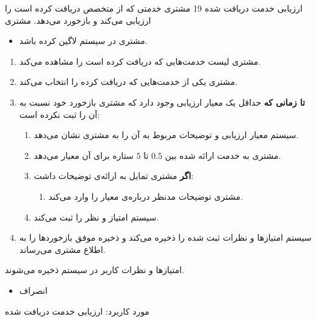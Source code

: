 {
\usecase
{
	ارزیابی خدمت دریافت شده
}
{19}
{
	مشتری خدمتی که از متخصص دریافت کرده است را ارزیابی می‌کند و بازخورد می‌دهد.
}
{
	مشتری
}
{}
{
		\begin{itemize}
		\vspace*{-0.6cm}
		\item 
		مشتری در سیستم لاگین کرده باشد.
	\end{itemize}
}
{
	\vspace*{-0.6cm}
	\begin{enumerate}
		\item 
		مشتری لیست خدمت‌‌هایی که دریافت کرده است را مشاهده می‌کند.
		\item
		مشتری یکی از خدمت‌هایی که دریافت کرده را انتخاب می‌کند.
		\item
		\textbf{تا زمانی که} حداقل یک معیار ارزیابی وجود دارد که مشتری بازخورد خود نسبت به آن را ثبت نکرده است:
		
		\begin{enumerate}[label=\theenumi.\arabic*.]
			\item
سیستم معیار ارزیابی و توضیحات مربوط به آن را به مشتری نشان می‌دهد.
			\item 
مشتری به خدمت ارائه شده بین $0.5$ تا $5$ ستاره برای آن معیار می‌دهد.
			\item 
			\textbf{اگر} مشتری تمایل به ارائه‌ی توضیحات داشت:
			\begin{enumerate}
				\item 
				مشتری توضیحات مدنظر درباره‌ی معیار را وارد می‌کند. 
			\end{enumerate}
			\item 
			سیستم امتیاز و نظر را ثبت می‌کند.
		\end{enumerate}
		\item
		سیستم امتیازها و نظرات ثبت شده را ذخیره می‌کند و ذخیره موفق بازخوردها را به اطلاع مشتری می‌رساند.
		
	\end{enumerate}
}
{
امتیازها و نظرات کاربر در سیستم ذخیره می‌شوند.
}
{
	\begin{itemize}
		\vspace*{-0.6cm}
		\item 
		انصراف
	\end{itemize}
}
{
	مورد کاربرد: ارزیابی خدمت دریافت شده
}





}
